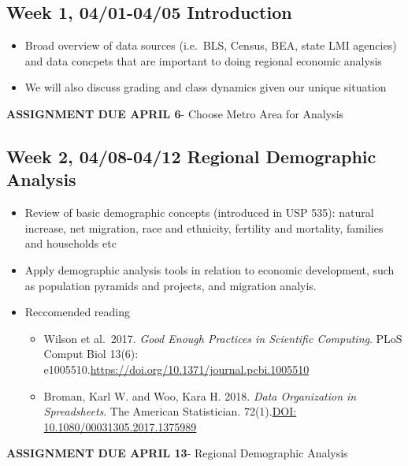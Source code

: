 \documentclass[11pt,]{article}
\providecommand{\tightlist}{%
  \setlength{\itemsep}{0pt}\setlength{\parskip}{0pt}}
\begin{document}
\hypertarget{week-1-0401-0405-introduction}{%
\subsection{Week 1, 04/01-04/05
Introduction}\label{week-1-0401-0405-introduction}}

\begin{itemize}
\item
  Broad overview of data sources (i.e.~BLS, Census, BEA, state LMI
  agencies) and data concpets that are important to doing regional
  economic analysis
\item
  We will also discuss grading and class dynamics given our unique
  situation
\end{itemize}

\textbf{ASSIGNMENT DUE APRIL 6}- Choose Metro Area for Analysis

\hypertarget{week-2-0408-0412-regional-demographic-analysis}{%
\subsection{Week 2, 04/08-04/12 Regional Demographic
Analysis}\label{week-2-0408-0412-regional-demographic-analysis}}

\begin{itemize}
\item
  Review of basic demographic concepts (introduced in USP 535): natural
  increase, net migration, race and ethnicity, fertility and mortality,
  families and households etc
\item
  Apply demographic analysis tools in relation to economic development,
  such as population pyramids and projects, and migration analyis.
\item
  Reccomended reading

  \begin{itemize}
  \tightlist
  \item
    Wilson et al.~2017. \emph{Good Enough Practices in Scientific
    Computing}. PLoS Comput Biol 13(6):
    e1005510.\url{https://doi.org/10.1371/journal.pcbi.1005510}
  \item
    Broman, Karl W. and Woo, Kara H. 2018. \emph{Data Organization in
    Spreadsheets}. The American Statistician.
    72(1).\href{10.1080/00031305.2017.1375989}{DOI:
    10.1080/00031305.2017.1375989}
  \end{itemize}
\end{itemize}

\textbf{ASSIGNMENT DUE APRIL 13}- Regional Demographic Analysis
\end{document}
